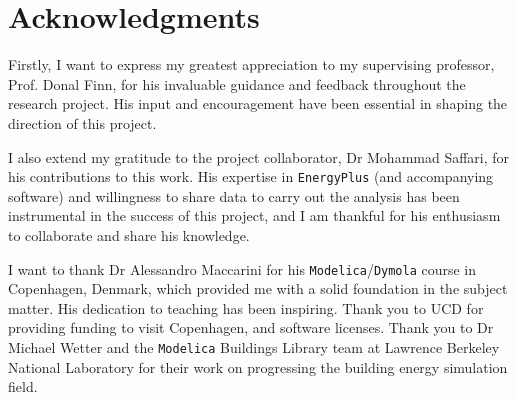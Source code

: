 


\bigskip

\begingroup
\let\clearpage\relax
\let\cleardoublepage\relax
\let\cleardoublepage\relax
\chapter*{Acknowledgments}
Firstly, I want to express my greatest appreciation to my supervising professor, Prof. Donal Finn, for his invaluable guidance and feedback throughout the research project. His input and encouragement have been essential in shaping the direction of this project.

I also extend my gratitude to the project collaborator, Dr Mohammad Saffari, for his contributions to this work. His expertise in \texttt{EnergyPlus} (and accompanying software) and willingness to share data to carry out the analysis has been instrumental in the success of this project, and I am thankful for his enthusiasm to collaborate and share his knowledge.

I want to thank Dr Alessandro Maccarini for his \texttt{Modelica}/\texttt{Dymola} course in Copenhagen, Denmark, which provided me with a solid foundation in the subject matter. His dedication to teaching has been inspiring. Thank you to UCD for providing funding to visit Copenhagen, and software licenses. Thank you to Dr Michael Wetter and the \texttt{Modelica} Buildings Library team at Lawrence Berkeley National Laboratory for their work on progressing the building energy simulation field. 

